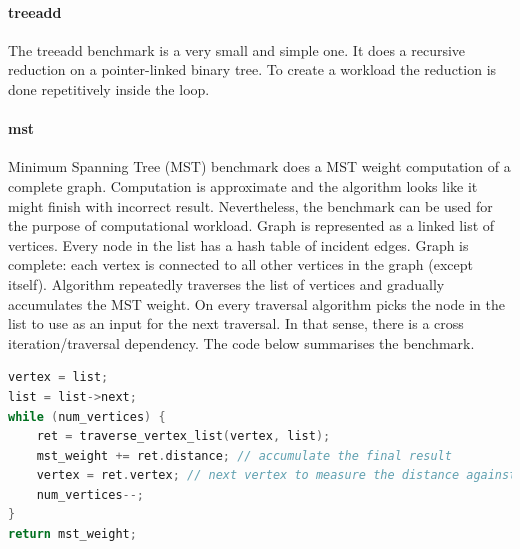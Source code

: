 \paragraph{treeadd} The treeadd benchmark is a very small and simple one. It does a recursive reduction on a pointer-linked binary tree. To create a workload the reduction is done repetitively inside the loop.   
\paragraph{mst} Minimum Spanning Tree (MST) benchmark does a MST weight computation of a complete graph. Computation is approximate and the algorithm looks like it might finish with incorrect result. Nevertheless, the benchmark can be used for the purpose of computational workload. Graph is represented as a linked list of vertices. Every node in the list has a hash table of incident edges. Graph is complete: each vertex is connected to all other vertices in the graph (except itself). Algorithm repeatedly traverses the list of vertices and gradually accumulates the MST weight. On every traversal algorithm picks the node in the list to use as an input for the next traversal. In that sense, there is a cross iteration/traversal dependency. The code below summarises the benchmark.\newline\null
\begin{minipage}[t]{\linewidth}
\begin{lstlisting}[caption={The main algorithm of mst benchmark.},label={lst:mst_code},language=C]
vertex = list;
list = list->next;
while (num_vertices) {
    ret = traverse_vertex_list(vertex, list);
    mst_weight += ret.distance; // accumulate the final result
    vertex = ret.vertex; // next vertex to measure the distance against
    num_vertices--;
}
return mst_weight;
\end{lstlisting}
\end{minipage}
